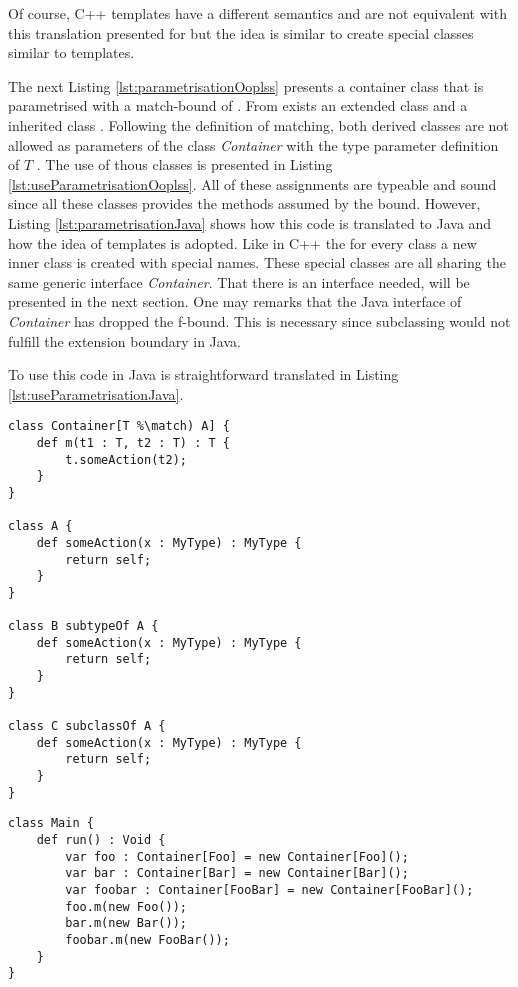 Of course, C++ templates have a different semantics and are not equivalent
with this translation presented for \ooplss but the idea is similar to
create special classes similar to templates.

The next Listing \ref{lst:parametrisationOoplss} presents a container
class that is parametrised with a match-bound of \A. From \A exists an
extended class \B and a inherited class \C. Following the definition
of matching, both derived classes are not allowed as parameters
of the class \emph{Container} with the type parameter definition
of $T$ \match \A.  The use of thous classes is presented in Listing
\ref{lst:useParametrisationOoplss}. All of these assignments are typeable
and sound since all these classes provides the methods assumed by the
bound. However, Listing \ref{lst:parametrisationJava} shows how this code
is translated to Java and how the idea of templates is adopted. Like
in C++ the for every class a new inner class is created with special
names. These special classes are all sharing the same generic interface
\emph{Container}. That there is an interface needed, will be presented
in the next section. One may remarks that the Java interface of
\emph{Container} has dropped the f-bound. This is necessary since
subclassing would not fulfill the extension boundary in Java.

 To use this code in Java is straightforward translated in Listing
\ref{lst:useParametrisationJava}.

\begin{lstlisting}[float,language=ooplss,caption=Parametrisation in \ooplss,label=lst:parametrisationOoplss]
class Container[T %\match) A] {
	def m(t1 : T, t2 : T) : T {
		t.someAction(t2);
	}
}

class A {
	def someAction(x : MyType) : MyType {
		return self;
	}
}

class B subtypeOf A {
	def someAction(x : MyType) : MyType {
		return self;
	}
}

class C subclassOf A {
	def someAction(x : MyType) : MyType {
		return self;
	}
}
\end{lstlisting}

\begin{lstlisting}[float,language=ooplss,caption=Valid use of a match-bound container,label=lst:useParametrisationOoplss]
class Main {
	def run() : Void {
		var foo : Container[Foo] = new Container[Foo]();
		var bar : Container[Bar] = new Container[Bar]();
		var foobar : Container[FooBar] = new Container[FooBar]();
		foo.m(new Foo());
		bar.m(new Bar());
		foobar.m(new FooBar());
	}
}
\end{lstlisting}

